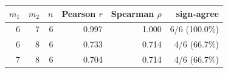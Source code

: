 \begingroup
{}
\small
\setlength{\tabcolsep}{6pt}
\renewcommand{\arraystretch}{1.15}
\setlength{\LTleft}{0pt}
\setlength{\LTright}{0pt}
\begin{longtable}{r r r r r r}
\toprule
$m_1$ & $m_2$ & $n$ & Pearson $r$ & Spearman $\rho$ & sign-agree \\
\midrule
6 & 7 & 6 & 0.997 & 1.000 & 6/6 (100.0\%) \\
6 & 8 & 6 & 0.733 & 0.714 & 4/6 (66.7\%) \\
7 & 8 & 6 & 0.704 & 0.714 & 4/6 (66.7\%) \\
\bottomrule
\end{longtable}
\endgroup

